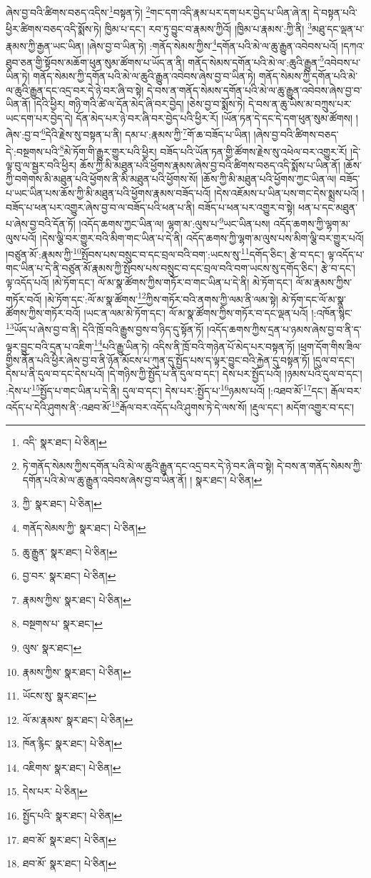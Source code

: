 ཞེས་བྱ་བའི་ཚིགས་བཅད་འདིས་\footnote{འདི་  སྣར་ཐང་།  པེ་ཅིན། }བསྟན་ཏེ། \footnote{ཏེ་གནོད་སེམས་ཀྱིས་དགོན་པའི་མེ་ལ་ཆུའི་རྒྱུན་དང་འདྲ་བར་དེ་ཉེ་བར་ཞི་བ་སྟེ། དེ་བས་ན་གནོད་སེམས་ཀྱི་དགོན་པའི་མེ་ལ་ཆུ་རྒྱུན་འབེབས་ཞེས་བྱ་བ་ཡིན་ནོ། །   སྣར་ཐང་།  པེ་ཅིན། }གང་དག་འདི་རྣམ་པར་དག་པར་བྱེད་པ་ཡིན་ཞེ་ན། དེ་བསྟན་པའི་ཕྱིར་ཚིགས་བཅད་འདི་སྨོས་ཏེ། ཁྱིམ་པ་དང་། རབ་ཏུ་བྱུང་བ་རྣམས་ཀྱིའོ། །ཁྱིམ་པ་རྣམས་:ཀྱི་ནི། \footnote{ཀྱི་  སྣར་ཐང་།  པེ་ཅིན། }མཐུ་དང་ལྡན་པ་རྣམས་ཀྱི་རྒྱན་ཡང་ཡིན། །ཞེས་བྱ་བ་ཡིན་ཏེ། :གནོད་སེམས་ཀྱིས་\footnote{གནོད་སེམས་ཀྱི་  སྣར་ཐང་།  པེ་ཅིན། }དགོན་པའི་མེ་ལ་ཆུ་རྒྱུན་འབེབས་པའོ། །དཀའ་ཐུབ་ཅན་གྱི་སྟོབས་མཆོག་ཕུན་སུམ་ཚོགས་པ་ཡོད་ན་ནི། གནོད་སེམས་དགོན་པའི་མེ་ལ་:ཆུའི་རྒྱུན་\footnote{ཆུ་རྒྱུན་  སྣར་ཐང་།  པེ་ཅིན། }འབེབས་པ་ཡིན་ཏེ། གནོད་སེམས་ཀྱི་དགོན་པའི་མེ་ལ་ཆུའི་རྒྱུན་འབེབས་ཞེས་བྱ་བ་ཡིན་ཏེ། གནོད་སེམས་ཀྱི་དགོན་པའི་མེ་ལ་ཆུའི་རྒྱུན་དང་འདྲ་བར་དེ་ཉེ་བར་ཞི་བ་སྟེ། དེ་བས་ན་གནོད་སེམས་དགོན་པའི་མེ་ལ་ཆུ་རྒྱུན་འབེབས་ཞེས་བྱ་བ་ཡིན་ནོ། །དེའི་ཕྱིར། གཉི་གའི་ཚེ་ལ་དོན་མེད་ཞི་བར་བྱེད། །ཅེས་བྱ་བ་སྨོས་ཏེ། དེ་བས་ན་ཆུ་ཡིས་མ་བཀྲུས་པར་ཡང་དག་པར་བྱེད་དེ། དོན་མེད་པར་ཉེ་བར་ཞི་བར་བྱེད་པའི་ཕྱིར་རོ། །ཡོན་ཏན་དེ་དང་དེ་དག་ཕུན་སུམ་ཚོགས། །ཞེས་:བྱ་བ་\footnote{བྱ་བར་  སྣར་ཐང་།  པེ་ཅིན། }དེའི་རྗེས་སུ་བསྟན་པ་ནི། དམ་པ་:རྣམས་ཀྱི་\footnote{རྣམས་ཀྱིས་  སྣར་ཐང་།  པེ་ཅིན། }གོ་ཆ་བཟོད་པ་ཡིན། །ཞེས་བྱ་བའི་ཚིགས་བཅད་དེ་:བསྔགས་པའི་\footnote{བསྔགས་པ་  སྣར་ཐང་། }མེ་ཏོག་གི་རྒྱུར་གྱུར་པའི་ཕྱིར། བཟོད་པའི་ཡོན་ཏན་གྱི་ཚོགས་རྗེས་སུ་འཕེལ་བར་འགྱུར་རོ། །དེ་ལྟ་བུ་ལ་སྦྱར་བའི་ཕྱིར། ཆོས་ཀྱི་མི་མཐུན་པའི་ཕྱོགས་རྣམས་ཞེས་བྱ་བའི་ཚིགས་བཅད་འདི་སྨོས་པ་ཡིན་ནོ། །ཆོས་ཀྱི་བགེགས་མི་མཐུན་པའི་ཕྱོགས་ནི་མི་མཐུན་པའི་ཕྱོགས་སོ། །ཆོས་ཀྱི་མི་མཐུན་པའི་ཕྱོགས་ཀྱང་ཡིན་ལ། བཟོད་པ་ཡང་ཡིན་པས་ཆོས་ཀྱི་མི་མཐུན་པའི་ཕྱོགས་རྣམས་བཟོད་པའོ། །དེས་འཇོམས་པ་ཡིན་པས་གང་དེས་སྨྲས་པའོ། །བཟོད་པ་ཕན་པར་འགྱུར་ཞེས་བྱ་བ་ལ་བཟོད་པའི་ཕན་པ་ནི། བཟོད་པ་ཕན་པར་འགྱུར་བ་སྟེ། ཕན་པ་དང་མཐུན་པ་ཞེས་བྱ་བའི་དོན་ཏོ། །འདོད་ཆགས་ཀྱང་ཡིན་ལ། ལྷག་མ་:ལུས་པ་\footnote{ལུས་  སྣར་ཐང་། }ཡང་ཡིན་པས། འདོད་ཆགས་ཀྱི་ལྷག་མ་ལུས་པའོ། །དེས་ལྕི་བར་གྱུར་བའི་མིག་གང་ཡིན་པ་དེ་ནི། འདོད་ཆགས་ཀྱི་ལྷག་མ་ལུས་པས་མིག་ལྕི་བར་གྱུར་པའོ། །བཙུན་མོ་:རྣམས་ཀྱི་\footnote{རྣམས་ཀྱིས་  སྣར་ཐང་།  པེ་ཅིན། }སྤོབས་པས་བསྲུང་བ་དང་བྲལ་བའི་བག་:ཡངས་སུ་\footnote{ཡོངས་སུ་  སྣར་ཐང་། }དགོད་ཅིང་། རྩེ་བ་དང་། ལྟ་འདོད་པ་གང་ཡིན་པ་དེ་ནི་བཙུན་མོ་རྣམས་ཀྱི་སྤོབས་པས་བསྲུང་བ་དང་བྲལ་བའི་བག་ཡངས་སུ་དགོད་ཅིང་། རྩེ་བ་དང་། ལྟ་འདོད་པའོ། །མེ་ཏོག་དང་། ལོ་མ་སྣ་ཚོགས་ཀྱིས་གཏོར་བ་གང་ཡིན་པ་དེ་ནི། མེ་ཏོག་དང་། ལོ་མ་རྣམས་ཀྱིས་གཏོར་བའོ། །མེ་ཏོག་དང་:ལོ་མ་སྣ་ཚོགས་\footnote{ལོ་མ་རྣམས་  སྣར་ཐང་།  པེ་ཅིན། }ཀྱིས་གཏོར་བའི་ནགས་ཀྱི་ལམ་ནི་ལམ་སྟེ། མེ་ཏོག་དང་ལོ་མ་སྣ་ཚོགས་ཀྱིས་གཏོར་བའོ། །ཡང་ན་ལམ་མེ་ཏོག་དང་། ལོ་མ་སྣ་ཚོགས་ཀྱིས་གཏོར་བ་དང་ལྡན་པའོ། །:འཁོན་སྙིང་\footnote{ཁོན་རྙིང་  སྣར་ཐང་།  པེ་ཅིན། }ཡོད་པ་ཞེས་བྱ་བ་ནི། དེའི་ཁྲོ་བའི་རྒྱུས་བྱས་བ་ཉིད་དུ་སྟོན་ཏོ། །འདོད་ཆགས་ཀྱིས་དྲན་པ་ཉམས་ཞེས་བྱ་བ་ནི་ད་ལྟར་བྱུང་བའི་དྲན་པ་འཇིག་\footnote{འཇིགས་  སྣར་ཐང་།  པེ་ཅིན། }པའི་རྒྱུ་ཡིན་ཏེ། འདིས་ནི་ཁྲོ་བའི་གཉེན་པོ་མེད་པར་བསྟན་ཏོ། །ཕྲག་དོག་གིས་ཟིལ་གྱིས་ནོན་པའི་ཕྱིར་ཞེས་བྱ་བ་ནི་ཉོན་མོངས་པ་ཀུན་དུ་སྤྱོད་པས་ད་ལྟར་བྱུང་བའི་རྐྱེན་དུ་བསྟན་ཏོ། །དུལ་བ་དང་། དེས་པ་ནི་དུལ་བ་དང་དེས་པའོ། །དེ་གཉིས་ཀྱི་སྤྱོད་པ་ནི་དུལ་བ་དང་། དེས་པར་སྤྱོད་པའོ། །ཉམས་པའི་དུལ་བ་དང་། :དེས་པ་\footnote{དེས་པར་  པེ་ཅིན། }སྤྱོད་པ་གང་ཡིན་པ་དེ་ནི། དུལ་བ་དང་། དེས་པར་:སྤྱོད་པ་\footnote{སྤྱོད་པའི་  སྣར་ཐང་།  པེ་ཅིན། }ཉམས་པའོ། །:འཐབ་མོ་\footnote{ཐབ་མོ་  སྣར་ཐང་།  པེ་ཅིན། }དང་། རྒོལ་བར་འདོད་པ་དེའི་ཤུགས་ནི་:འཐབ་མོ་\footnote{ཐབ་མོ་  སྣར་ཐང་།  པེ་ཅིན། }རྒོལ་བར་འདོད་པའི་ཤུགས་ཏེ་དེ་ལས་སོ། །རྡུལ་དང་། མདོག་འགྱུར་བ་དང་། 